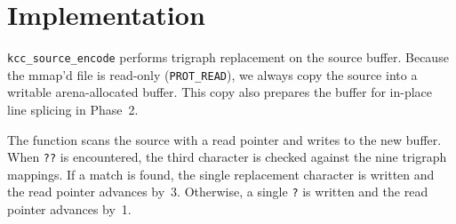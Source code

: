 \documentclass[11pt,a4paper,twoside,openright,DIV=15]{scrbook}
\theoremstyle{definition}
\theoremstyle{plain}
\theoremstyle{remark}
\begin{document}
\section{Implementation}

\texttt{kcc\_source\_encode} performs trigraph replacement on the
source buffer.  Because the mmap'd file is read-only
(\texttt{PROT\_READ}), we always copy the source into a writable
arena-allocated buffer.  This copy also prepares the buffer for
in-place line splicing in Phase~2.

The function scans the source with a read pointer and writes to the
new buffer.  When \texttt{??} is encountered, the third character is
checked against the nine trigraph mappings.  If a match is found, the
single replacement character is written and the read pointer advances
by~3.  Otherwise, a single \texttt{?} is written and the read pointer
advances by~1.
\end{document}
